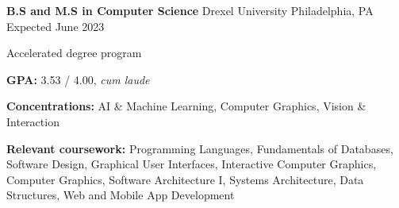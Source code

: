 

\begin{cventries}

  \cventry
  {\textbf{B.S and M.S in Computer Science}} %
  {Drexel University} %
  {Philadelphia, PA} %
  {Expected June 2023} %
  {
    \begin{cvitems} %
      \item {Accelerated degree program}
      \item {\textbf{GPA:} 3.53 / 4.00, \textit{cum laude}}
      \item {\textbf{Concentrations:} AI \& Machine Learning, Computer Graphics, Vision \& Interaction}
      \item {\color{darktext} \textbf{Relevant coursework:}
        Programming Languages,
        Fundamentals of Databases,
        Software Design,
        Graphical User Interfaces,
        Interactive Computer Graphics,
        Computer Graphics,
        Software Architecture I,
        Systems Architecture,
        Data Structures,
        Web and Mobile App Development
      }
    \end{cvitems}
  } 

\end{cventries}
